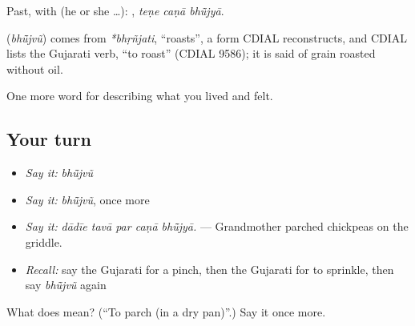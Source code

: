 Past, with  (he or she …):   , \emph{teṇe caṇā bhū̃jyā}.

\begin{cousinweb}
\textbf{} (\emph{bhū̃jvũ}) comes from \emph{*bhṛñjati}, \textquotedblleft{}roasts\textquotedblright{}, a form CDIAL reconstructs, and CDIAL lists the Gujarati verb, \textquotedblleft{}to roast\textquotedblright{} (CDIAL 9586); it is said of grain roasted without oil.
\end{cousinweb}

\begin{grammarlens}[title={What you've built}]
One more word for describing what you lived and felt.
\end{grammarlens}

\subsection*{Your turn}
\begin{itemize}
\raggedright
  \item \emph{Say it:} \emph{bhū̃jvũ}
  \item \emph{Say it:} \emph{bhū̃jvũ}, once more
  \item \emph{Say it:} \emph{dādīe tavā par caṇā bhū̃jyā.} — Grandmother parched chickpeas on the griddle.
  \item \emph{Recall:} say the Gujarati for a pinch, then the Gujarati for to sprinkle, then say \emph{bhū̃jvũ} again
\end{itemize}

\begin{tcolorbox}[breakable,colback=teal!4,colframe=teal!35!black,title={Before you move on}]
What does  mean? (\textquotedblleft{}To parch (in a dry pan)\textquotedblright{}.) Say it once more.
\end{tcolorbox}
